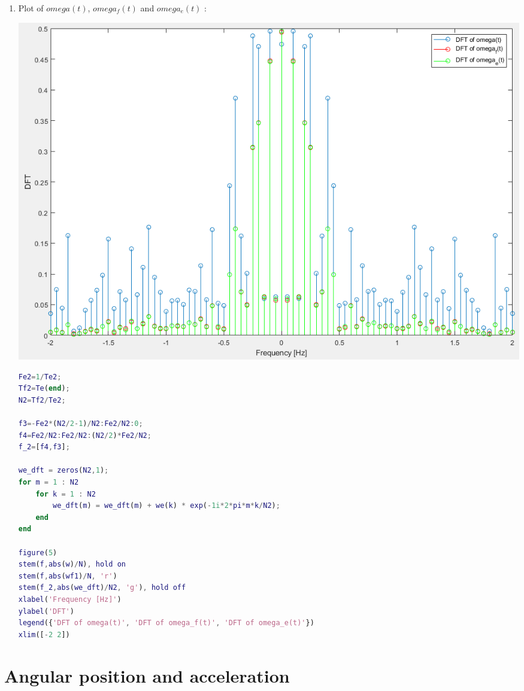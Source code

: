 \documentclass[a4paper,12pt]{article}
\begin{document}
\begin{enumerate}[label={\color{blue}\arabic*)}]
    \item
    Plot of \(omega(t)\), \(omega_f(t)\) and \(omega_e(t)\) :
    \begin{multicols}{2}
        \begin{flushleft}
            \includegraphics[width=1\linewidth]{Images/w_wf_weDFT.png}
            \label{Figure9}
        \end{flushleft}

        \columnbreak

        \begin{lstlisting}[style=Matlab-editor,language=Matlab, basicstyle=\small\ttfamily]
Fe2=1/Te2;
Tf2=Te(end);
N2=Tf2/Te2;

f3=-Fe2*(N2/2-1)/N2:Fe2/N2:0;
f4=Fe2/N2:Fe2/N2:(N2/2)*Fe2/N2;
f_2=[f4,f3];

we_dft = zeros(N2,1);
for m = 1 : N2
    for k = 1 : N2
        we_dft(m) = we_dft(m) + we(k) * exp(-1i*2*pi*m*k/N2);
    end
end

figure(5)
stem(f,abs(w)/N), hold on
stem(f,abs(wf1)/N, 'r')
stem(f_2,abs(we_dft)/N2, 'g'), hold off
xlabel('Frequency [Hz]')
ylabel('DFT')
legend({'DFT of omega(t)', 'DFT of omega_f(t)', 'DFT of omega_e(t)'})
xlim([-2 2])
        \end{lstlisting}
    \end{multicols}

\end{enumerate}

\newpage
\section{Angular position and acceleration}
\end{document}
